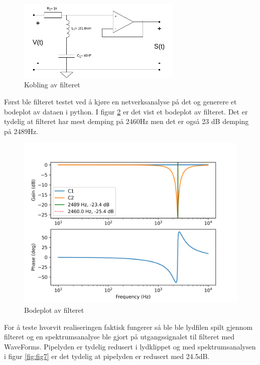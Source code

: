 \begin{figure}[!h]
	\centering
	\includegraphics[width=0.7\textwidth]{Bilder/RLC_filter.drawio.png}
	\caption{Kobling av filteret}
	\label{fig:fig5}
\end{figure}


Først ble filteret testet ved å kjøre en netverksanalyse på det og generere et bodeplot av dataen i python. I figur \ref{fig:fig6} er det vist et bodeplot av filteret. Det er tydelig at filteret har mest demping på 2460Hz men det er også 23 dB demping på 2489Hz. 

\begin{figure}[!h]
	\centering
	\includegraphics[width=1\textwidth]{Bilder/bode1K.png}
	\caption{Bodeplot av filteret}
	\label{fig:fig6}
\end{figure}

For å teste hvorvit realiseringen faktisk fungerer så ble ble lydfilen spilt gjennom filteret og en spektrumsanalyse ble gjort på utgangssignalet til filteret med WaveForms. Pipelyden er tydelig redusert i lydklippet og med spektrumsanalysen i figur \ref{fig:fig7} er det tydelig at pipelyden er redusert med 24.5dB. 

